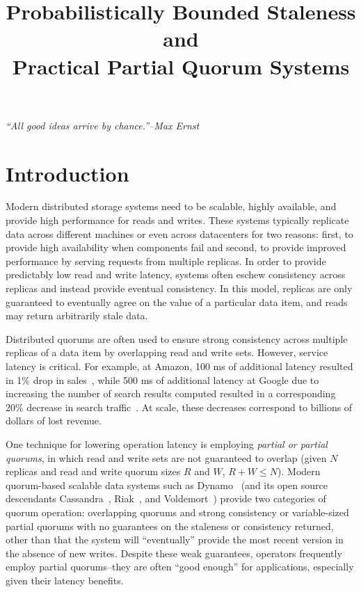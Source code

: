 \documentclass{vldb}
\title{Probabilistically Bounded Staleness and\\ Practical Partial Quorum Systems}
\begin{document}

\maketitle

\noindent\textit{``All good ideas arrive by chance.''--Max Ernst}



\section{Introduction}

Modern distributed storage systems need to be scalable, highly
available, and provide high performance for reads and writes.  These
systems typically replicate data across different machines or even
across datacenters for two reasons: first, to provide high
availability when components fail and second, to provide improved
performance by serving requests from multiple replicas.  In order to
provide predictably low read and write latency, systems often eschew
consistency across replicas and instead provide eventual
consistency. In this model, replicas are only guaranteed to eventually
agree on the value of a particular data item, and reads may return
arbitrarily stale data.

Distributed quorums are often used to ensure strong consistency across
multiple replicas of a data item by overlapping read and write
sets. However, service latency is critical. For example, at Amazon,
100 ms of additional latency resulted in 1\% drop in
sales~\cite{amazon-latency}, while 500 ms of additional latency at
Google due to increasing the number of search results computed
resulted in a corresponding 20\% decrease in search
traffic~\cite{google-talk}.  At scale, these decreases correspond to
billions of dollars of lost revenue.

One technique for lowering operation latency is employing
\textit{partial or partial quorums}, in which read and write sets
are not guaranteed to overlap (given $N$ replicas and read and write
quorum sizes $R$ and $W$, $R+W \leq N$).  Modern quorum-based scalable
data systems such as Dynamo~\cite{dynamo} (and its open source
descendants Cassandra~\cite{cassandra}, Riak~\cite{riak}, and
Voldemort~\cite{voldemort}) provide two categories of quorum
operation: overlapping quorums and strong consistency or
variable-sized partial quorums with no guarantees on the staleness or
consistency returned, other than that the system will ``eventually''
provide the most recent version in the absence of new writes.  Despite
these weak guarantees, operators frequently employ partial
quorums--they are often ``good enough'' for applications, especially
given their latency benefits.
\end{document}
